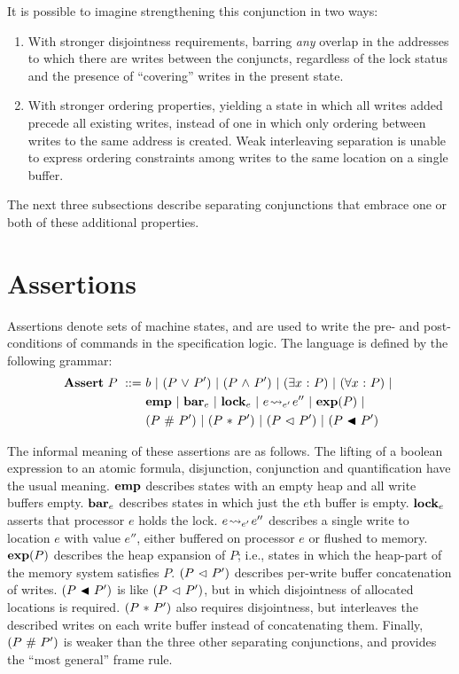 \documentclass[11pt]{report}
\begin{document}
It is possible to imagine strengthening this conjunction in two ways: \begin{enumerate}
  \item With stronger disjointness requirements, barring \emph{any} overlap in the addresses to which there are writes between the conjuncts, regardless of the lock status and the presence of ``covering'' writes in the present state.  
  
  \item With stronger ordering properties, yielding a state in which all writes added precede all existing writes, instead of one in which only ordering between writes to the same address is created. Weak interleaving separation is unable to express ordering constraints among writes to the same location on a single buffer. 
\end{enumerate}

The next three subsections describe separating conjunctions that embrace one or both of these additional properties. 




\section{Assertions}
\label{sec:assertions}
\label{sec:multiprocessor-assertions}

Assertions denote sets of machine states, and are used to write the pre- and post-conditions of commands in the specification logic. The language is defined by the following grammar: \begin{align*}
	\mathbf{Assert}~P ~::=~ & b ~|~ (P \operatorname{\,\vee\,} P') ~|~ (P \operatorname{\,\wedge\,} P') ~|~ (\exists x \operatorname{\,:\,} P) ~|~ (\forall x \operatorname{\,:\,} P) ~|~ \\
	& \mathbf{emp} ~|~ \mathbf{bar}_{e} ~|~ \mathbf{lock}_{e} ~|~ e \!\leadsto_{e'}\! e'' ~|~  \mathbf{exp}({P}) ~|~ \\ 
	& (P \operatorname{\,\#\,} P') ~|~ (P \operatorname{\,\ast\,} P') ~|~ (P \operatorname{\,\vartriangleleft\,} P') ~|~ (P \operatorname{\,\blacktriangleleft\,} P')
\end{align*} 

The informal meaning of these assertions are as follows. The lifting of a boolean expression to an atomic formula, disjunction, conjunction and quantification have the usual meaning. $\mathbf{emp}$ describes states with an empty heap and all write buffers empty. $\mathbf{bar}_{e}$ describes states in which just the $e$th buffer is empty. $\mathbf{lock}_{e}$ asserts that processor $e$ holds the lock. $e \!\leadsto_{e'}\! e''$ describes a single write to location $e$ with value $e''$, either buffered on processor $e$ or flushed to memory. $\mathbf{exp}({P})$ describes the heap expansion of $P$; i.e., states in which the heap-part of the memory system satisfies $P$. $(P \operatorname{\,\vartriangleleft\,} P')$ describes per-write buffer concatenation of writes. $(P \operatorname{\,\blacktriangleleft\,} P')$ is like $(P \operatorname{\,\vartriangleleft\,} P')$, but in which disjointness of allocated locations is required. $(P \operatorname{\,\ast\,} P')$ also requires disjointness, but interleaves the described writes on each write buffer instead of concatenating them. Finally, $(P \operatorname{\,\#\,} P')$ is weaker than the three other separating conjunctions, and provides the ``most general'' frame rule. 
\end{document}
